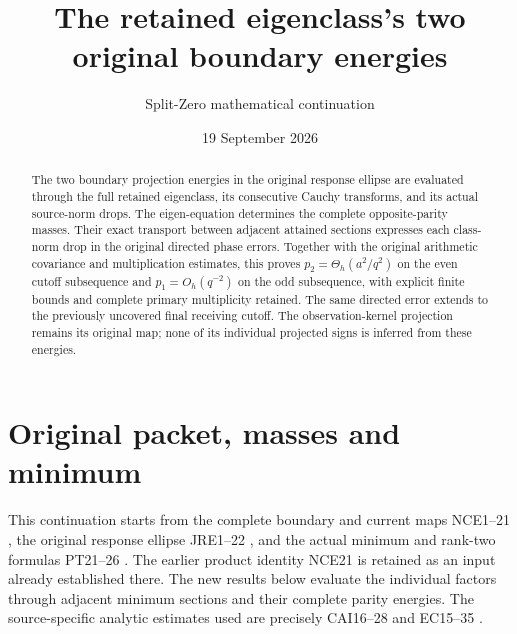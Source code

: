 \documentclass[11pt]{article}
\title{The retained eigenclass's two original boundary energies}
\author{Split-Zero mathematical continuation}
\date{19 September 2026}
\begin{document}
\maketitle

\begin{abstract}
The two boundary projection energies in the original response ellipse
are evaluated through the full retained eigenclass, its consecutive
Cauchy transforms, and its actual source-norm drops. The eigen-equation
determines the complete opposite-parity masses. Their exact transport
between adjacent attained sections expresses each class-norm drop in
the original directed phase errors. Together with the original
arithmetic covariance and multiplication estimates, this proves
\(p_2=\Theta_h(a^2/q^2)\) on the even cutoff subsequence and
\(p_1=O_h(q^{-2})\) on the odd subsequence, with explicit finite
bounds and complete primary multiplicity retained. The same directed
error extends to the previously uncovered final receiving cutoff.
The observation-kernel projection remains its original map; none
of its individual projected signs is inferred from these energies.
\end{abstract}

\section{Original packet, masses and minimum}

This continuation starts from the complete boundary and current maps
NCE1--21 \cite{nce}, the original response ellipse JRE1--22
\cite{jre}, and the actual minimum and rank-two formulas PT21--26
\cite{pt}. The earlier product identity NCE21 is retained as an
input already established there. The new results below evaluate the
individual factors through adjacent minimum sections and their
complete parity energies. The source-specific analytic estimates used
are precisely CAI16--28 \cite{cai} and EC15--35 \cite{ec}.
\end{document}
